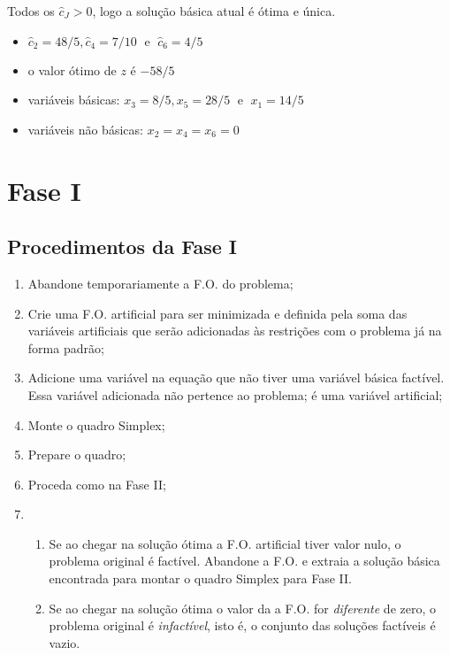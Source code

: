 Todos os $ \widehat{c}_J > 0 $, logo a solução básica atual é ótima e única.

\begin{itemize}
  \item $ \widehat{c}_2 = 48/5, \widehat{c}_4 = 7/10 \;\text{ e }\; \widehat{c}_6 = 4/5 $
  \item o valor ótimo de $ z $ é $ -58/5 $
  \item variáveis básicas: $ x_3 = 8/5, x_5 = 28/5 \;\text{ e }\; x_1 = 14/5 $
  \item variáveis não básicas: $ x_2 = x_4 = x_6 = 0 $
\end{itemize}

\section{Fase I} %

\subsection{Procedimentos da Fase I}

\begin{enumerate}
  \item Abandone temporariamente a F.O. do problema;
  \item Crie uma F.O. artificial para ser minimizada e definida pela soma das 
        variáveis artificiais que serão adicionadas às restrições com o problema
        já na forma padrão;
  \item Adicione uma variável na equação que não tiver uma variável básica 
        factível.
        Essa variável adicionada não pertence ao problema; é uma variável 
        artificial;
  \item Monte o quadro Simplex;
  \item Prepare o quadro;
  \item Proceda como na Fase II;
  \item 
   \begin{enumerate}
     \item Se ao chegar na solução ótima a F.O. artificial tiver valor nulo, o 
           problema original é factível.
           Abandone a F.O. e extraia a solução básica encontrada para montar o
           quadro Simplex para Fase II.
     \item Se ao chegar na solução ótima o valor da a F.O. for \textit{diferente} 
           de zero, o problema original é \textit{infactível}, isto é, o conjunto
           das soluções factíveis é vazio.           
   \end{enumerate}
\end{enumerate}

